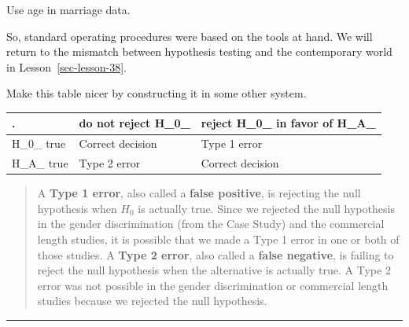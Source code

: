 \documentclass[
  letterpaper,
  DIV=11,
  numbers=noendperiod,
  oneside]{scrreprt}
\begin{document}
Use age in marriage data.

So, standard operating procedures were based on the tools at hand. We
will return to the mismatch between hypothesis testing and the
contemporary world in Lesson~\ref{sec-lesson-38}.

Make this table nicer by constructing it in some other system.

\begin{longtable}[]{@{}lll@{}}
\toprule()
. & do not reject H\_0\_ & reject H\_0\_ in favor of H\_A\_ \\
\midrule()
\endhead
H\_0\_ true & Correct decision & Type 1 error \\
H\_A\_ true & Type 2 error & Correct decision \\
\bottomrule()
\end{longtable}

\begin{quote}
A \textbf{Type 1 error}, also called a \textbf{false positive}, is
rejecting the null hypothesis when \(H_0\) is actually true. Since we
rejected the null hypothesis in the gender discrimination (from the Case
Study) and the commercial length studies, it is possible that we made a
Type 1 error in one or both of those studies. A \textbf{Type 2 error},
also called a \textbf{false negative}, is failing to reject the null
hypothesis when the alternative is actually true. A Type 2 error was not
possible in the gender discrimination or commercial length studies
because we rejected the null hypothesis.
\end{quote}

\begin{center}\rule{0.5\linewidth}{0.5pt}\end{center}
\end{document}
